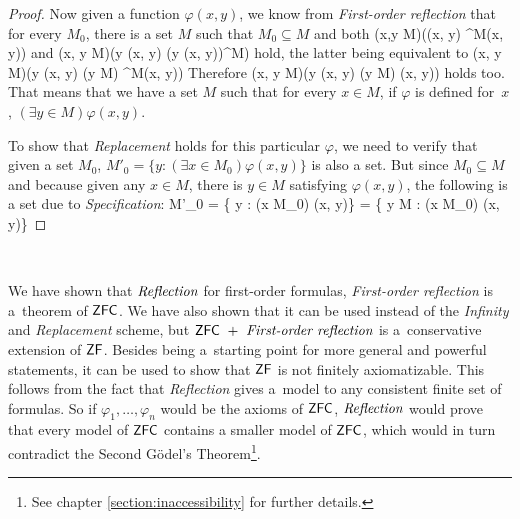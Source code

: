\begin{proof}
Now given a function $\varphi(x, y)$, we know from \emph{First-order reflection} that for every $M_0$, there is a set $M$ such that $M_0 \subseteq M$ and both
\beq
(\forall x,y \in M)(\varphi(x, y) \iff \varphi^M(x, y))
\eeq 
and
\beq
(\forall x, y \in M)(\exists y \varphi(x, y) \iff (\exists y \varphi(x, y))^M)
\eeq 
hold, the latter being equivalent to 
\beq
(\forall x, y \in M)(\exists y \varphi(x, y) \iff (\exists y \in M) \varphi^M(x, y))
\eeq
Therefore 
\beq
(\forall x, y \in M)(\exists y \varphi(x, y) \iff (\exists y \in M) \varphi(x, y))
\eeq
holds too.
That means that we have a set $M$ such that for every $x \in M$, if $\varphi$ is defined for~$x$, $(\exists y \in M) \varphi(x, y)$. 

To show that \emph{Replacement} holds for this particular $\varphi$, we need to verify that given a set $M_0$, $M'_0 = \{ y : (\exists x \in M_0) \varphi(x, y)\}$ is also a set. But since $M_0 \subseteq M$ and because given any $x \in M$, there is $y \in M$ satisfying $\varphi(x, y)$, the following is a set due to \emph{Specification}:
\beq
M'_0 = \{ y : (\exists x \in M_0) \varphi(x, y)\} = \{ y \in M : (\exists x \in M_0) \varphi(x, y)\}
\eeq

\end{proof}

\


We have shown that $\emph{Reflection}$ for first-order formulas, \emph{First-order reflection} is a~theorem of $\sf{ZFC}$.%
We have also shown that it can be used instead of the \emph{Infinity} and \emph{Replacement} scheme, but $\sf{ZFC}\ +\ \emph{First-order reflection}$ is a~conservative extension of $\sf{ZF}$. Besides being a~starting point for more general and powerful statements, it can be used to show that $\sf{ZF}$ is not finitely axiomatizable. This follows from the fact that \emph{Reflection} gives a~model to any consistent finite set of formulas. %
So if $\varphi_1, \ldots, \varphi_n$ would be the axioms of $\sf{ZFC}$, $\emph{Reflection}$ would prove that every model of $\sf{ZFC}$ contains a smaller model of $\sf{ZFC}$, which would in turn contradict the Second Gödel's Theorem\footnote{See chapter \ref{section:inaccessibility} for further details.}.

